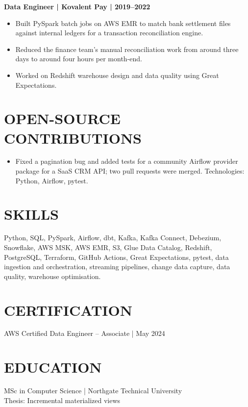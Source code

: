 \documentclass[11pt,a4paper]{article}
\begin{document}
\textbf{Data Engineer | Kovalent Pay | 2019--2022}
\begin{itemize}
\item Built PySpark batch jobs on AWS EMR to match bank settlement files against internal ledgers for a transaction reconciliation engine.
\item Reduced the finance team's manual reconciliation work from around three days to around four hours per month-end.
\item Worked on Redshift warehouse design and data quality using Great Expectations.
\end{itemize}

\section*{OPEN-SOURCE CONTRIBUTIONS}
\begin{itemize}
\item Fixed a pagination bug and added tests for a community Airflow provider package for a SaaS CRM API; two pull requests were merged. Technologies: Python, Airflow, pytest.
\end{itemize}

\section*{SKILLS}
Python, SQL, PySpark, Airflow, dbt, Kafka, Kafka Connect, Debezium, Snowflake, AWS MSK, AWS EMR, S3, Glue Data Catalog, Redshift, PostgreSQL, Terraform, GitHub Actions, Great Expectations, pytest, data ingestion and orchestration, streaming pipelines, change data capture, data quality, warehouse optimisation.

\section*{CERTIFICATION}
AWS Certified Data Engineer -- Associate | May 2024

\section*{EDUCATION}
MSc in Computer Science | Northgate Technical University\\
Thesis: Incremental materialized views
\end{document}
